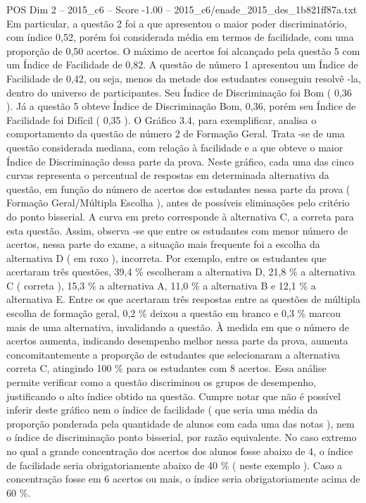 \begin{textsample}{POS Dim 2 – 2015\_c6 – Score -1.00 – 2015\_c6/enade\_2015\_des\_1b821ff87a.txt}
Em particular, a questão 2 foi a que apresentou o maior poder discriminatório, com índice 0,52, porém foi considerada média em termos de facilidade, com uma proporção de 0,50 acertos.
O máximo de acertos foi alcançado pela questão 5 com um Índice de Facilidade de 0,82.
A questão de número 1 apresentou um Índice de Facilidade de 0,42, ou seja, menos da metade dos estudantes conseguiu resolvê -la, dentro do universo de participantes.
Seu Índice de Discriminação foi Bom ( 0,36 ).
Já a questão 5 obteve Índice de Discriminação Bom, 0,36, porém seu Índice de Facilidade foi Difícil ( 0,35 ).
O Gráfico 3.4, para exemplificar, analisa o comportamento da questão de número 2 de Formação Geral.
Trata -se de uma questão considerada mediana, com relação à facilidade e a que obteve o maior Índice de Discriminação dessa parte da prova.
Neste gráfico, cada uma das cinco curvas representa o percentual de respostas em determinada alternativa da questão, em função do número de acertos dos estudantes nessa parte da prova ( Formação Geral/Múltipla Escolha ), antes de possíveis eliminações pelo critério do ponto bisserial.
A curva em preto corresponde à alternativa C, a correta para esta questão.
Assim, observa -se que entre os estudantes com menor número de acertos, nessa parte do exame, a situação mais frequente foi a escolha da alternativa D ( em roxo ), incorreta.
Por exemplo, entre os estudantes que acertaram três questões, 39,4 \% escolheram a alternativa D, 21,8 \% a alternativa C ( correta ), 15,3 \% a alternativa A, 11,0 \% a alternativa B e 12,1 \% a alternativa E.
Entre os que acertaram três respostas entre as questões de múltipla escolha de formação geral, 0,2 \% deixou a questão em branco e 0,3 \% marcou mais de uma alternativa, invalidando a questão.
À medida em que o número de acertos aumenta, indicando desempenho melhor nessa parte da prova, aumenta concomitantemente a proporção de estudantes que selecionaram a alternativa correta C, atingindo 100 \% para os estudantes com 8 acertos.
Essa análise permite verificar como a questão discriminou os grupos de desempenho, justificando o alto índice obtido na questão.
Cumpre notar que não é possível inferir deste gráfico nem o índice de facilidade ( que seria uma média da proporção ponderada pela quantidade de alunos com cada uma das notas ), nem o índice de discriminação ponto bisserial, por razão equivalente.
No caso extremo no qual a grande concentração dos acertos dos alunos fosse abaixo de 4, o índice de facilidade seria obrigatoriamente abaixo de 40 \% ( neste exemplo ).
Caso a concentração fosse em 6 acertos ou mais, o índice seria obrigatoriamente acima de 60 \%.

\end{textsample}
